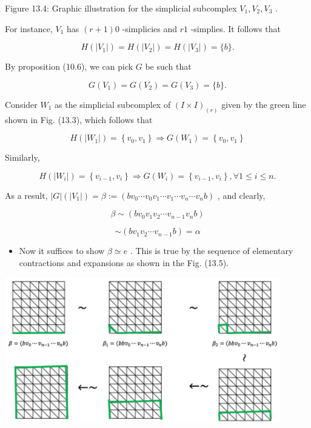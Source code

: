 Figure 13.4: Graphic illustration for the simplicial subcomplex \({V}_{1},{V}_{2},{V}_{3}\) .

For instance, \({V}_{1}\) has \(\left( {r + 1}\right) 0\) -simplicies and \({r1}\) -simplies. It follows that

\[
H\left( \left| {V}_{1}\right| \right)  = H\left( \left| {V}_{2}\right| \right)  = H\left( \left| {V}_{3}\right| \right)  = \{ b\} .
\]

By proposition (10.6), we can pick \(G\) be such that

\[
G\left( {V}_{1}\right)  = G\left( {V}_{2}\right)  = G\left( {V}_{3}\right)  = \{ b\} .
\]

Consider \({W}_{1}\) as the simplicial subcomplex of \({\left( I \times  I\right) }_{\left( r\right) }\) given by the green line shown in Fig. (13.3), which follows that

\[
H\left( \left| {W}_{1}\right| \right)  = \left\{  {{v}_{0},{v}_{1}}\right\}   \Rightarrow  G\left( {W}_{1}\right)  = \left\{  {{v}_{0},{v}_{1}}\right\}
\]

Similarly,

\[
H\left( \left| {W}_{i}\right| \right)  = \left\{  {{v}_{i - 1},{v}_{i}}\right\}   \Rightarrow  G\left( {W}_{i}\right)  = \left\{  {{v}_{i - 1},{v}_{i}}\right\}  ,\forall 1 \leq  i \leq  n.
\]

As a result, \(\left| G\right| \left( \left| {V}_{1}\right| \right)  = \beta  \mathrel{\text{ := }} \left( {b{v}_{0}\cdots {v}_{0}{v}_{1}\cdots {v}_{1}\cdots {v}_{n}\cdots {v}_{n}b}\right)\) , and clearly,

\[
\beta  \sim  \left( {b{v}_{0}{v}_{1}{v}_{2}\cdots {v}_{n - 1}{v}_{n}b}\right)
\]

\[
\sim  \left( {b{v}_{1}{v}_{2}\cdots {v}_{n - 1}b}\right)  = \alpha
\]

\begin{itemize}
\item Now it suffices to show \(\beta  \simeq  e\) . This is true by the sequence of elementary contractions and expansions as shown in the Fig. (13.5).
\end{itemize}

\begin{center}
\includegraphics[max width=0.9\textwidth]{images/bo_d2bcsrref24c73avs720_134_260_446_1103_584_0.jpg}
\end{center}
\hspace*{3em} 

